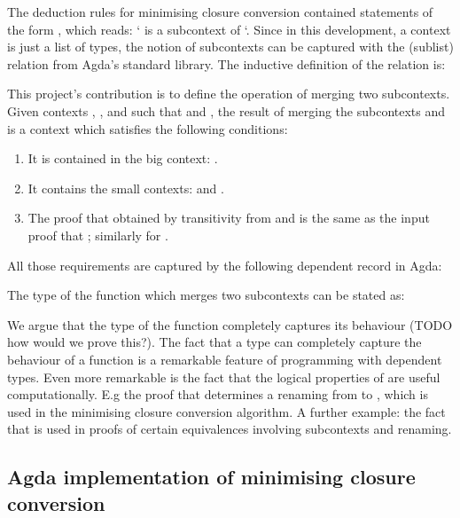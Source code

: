 \documentclass[bsc,frontabs,twoside,singlespacing,parskip,deptreport]{infthesis}
\theoremstyle{definition}
\begin{document}
The deduction rules for minimising closure conversion contained
statements of the form , which reads: ` is a
subcontext of `. Since in this development, a context is just a
list of types, the notion of subcontexts can be captured with the
 (sublist) relation from Agda's standard library. The
inductive definition of the relation is:


This project's contribution is to define the operation of merging two
subcontexts. Given contexts , , and  such that
 and , the result of merging the subcontexts
 and  is a context  which satisfies the following
conditions:

\begin{enumerate}
\item It is contained in the big context: .
\item It contains the small contexts:  and .
\item The proof that  obtained by transitivity from  and  is the same as the input proof that ; similarly for .
\end{enumerate}

All those requirements are captured by the following dependent record
in Agda:


The type of the function which merges two subcontexts can be stated
as:


We argue that the type of the function completely captures its
behaviour (TODO how would we prove this?). The fact that a type can
completely capture the behaviour of a function is a remarkable feature
of programming with dependent types. Even more remarkable is the fact
that the logical properties of  are useful computationally. E.g
the proof that  determines a renaming from  to
, which is used in the minimising closure conversion
algorithm. A further example: the fact that  is used in proofs of certain equivalences involving subcontexts
and renaming.

\subsection{Agda implementation of minimising closure conversion}
\label{sec:agda-impl-minim}
\end{document}
